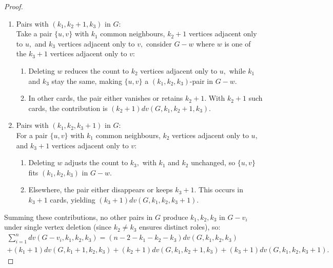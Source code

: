 \documentclass[10pt,a4paper]{amsart}
\begin{document}
\begin{proof}
\begin{enumerate}
\item[(3)] Pairs with $(k_1,k_2+1,k_3)$ in $G$:\\
Take a pair $\{u,v\}$ with $k_1$ common neighbours, $k_2+1$ vertices adjacent only to $u,$ and $k_3$ vertices adjacent only to $v,$  consider $G-w$ where $w$ is one of the $k_3+1$ vertices adjacent only to $v:$
\begin{enumerate}
\item[{\bf \LARGE .}] Deleting $w$ reduces the count to $k_2$ vertices adjacent only to $u,$ while $k_1$ and $k_3$ stay the same, making  $\{u,v\}$ a $(k_1,k_2,k_3)$-pair in $G-w.$
\item[{\bf \LARGE .}] In other cards, the pair either vanishes or retains $k_2+1.$ With $k_2+1$ such cards, the contribution is $(k_2+1)dv(G, k_1,k_2+1,k_3).$
\end{enumerate}

\item[(4)] Pairs with $(k_1,k_2,k_3+1)$ in $G$:\\
For a pair $\{u,v\}$ with $k_1$ common neighbours, $k_2$ vertices adjacent only to $u,$ and $k_3+1$ vertices adjacent only to $v:$
\begin{enumerate}
\item[{\bf \LARGE .}] Deleting $w$ adjusts the count to $k_3,$ with $k_1$ and $k_2$ unchanged, so $\{u,v\}$ fits $(k_1,k_2,k_3)$ in $G-w.$
\item[{\bf \LARGE .}] Elsewhere, the pair either disappears or keeps $k_3+1.$ This occurs in $k_3+1$ cards, yielding $(k_3+1)dv(G, k_1,k_2,k_3+1).$
\end{enumerate}
\end{enumerate}
Summing these contributions, no other pairs in $G$ produce $k_1,k_2,k_3$ in $G-v_i$ under single vertex deletion (since $k_2 \neq k_3$ ensures distinct roles), so:
\begin{multline} \sum_{i=1}^{n}{dv(G-v_i,k_1,k_2,k_3)}=(n-2-k_1-k_2-k_3)dv(G,k_1,k_2,k_3)\\+(k_1+1)dv(G,k_1+1,k_2,k_3)
+(k_2+1)dv(G,k_1,k_2+1,k_3)+(k_3+1)dv(G,k_1,k_2,k_3+1). 
\end{multline}

\end{proof}
\end{document}
